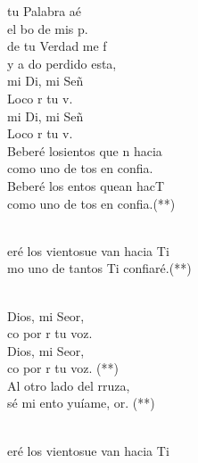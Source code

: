 \documentclass[12pt]{article}
\begin{document}
\begin{multicols*}{2}
\begin{cancion}[Hacia Ti][Ixcís]%
	tu Palabra aé\\
	el bo de mis p.\\
	de tu Verdad me f\\
	y a do perdido esta,\\
	mi Di, mi Señ\\
	Loco  r tu v. \\
	mi Di, mi Señ\\
	Loco  r tu v.\\
\jump
	Beberé losientos que n hacia\\
	como uno de tos en  confia.\\
	Beberé los entos quean hacT\\
	como uno de tos en  confia.(**)\\\jump\\
	\begin{chorus}%
	eré los vientosue van hacia Ti\\
	mo uno de tantos Ti confiaré.(**)\\
	\end{chorus}%
	\jump\\
	Dios, mi Seor,\\
	co por r tu voz.\\
	Dios, mi Seor,\\
	co por r tu voz. (**)\\
\jump
	Al otro lado del rruza,\\
	sé mi ento yuíame, or. (**) \\\jump\\
	\begin{chorus}%
	eré los vientosue van hacia Ti\\

\end{chorus}
\end{cancion}
\end{multicols*}
\end{document}
